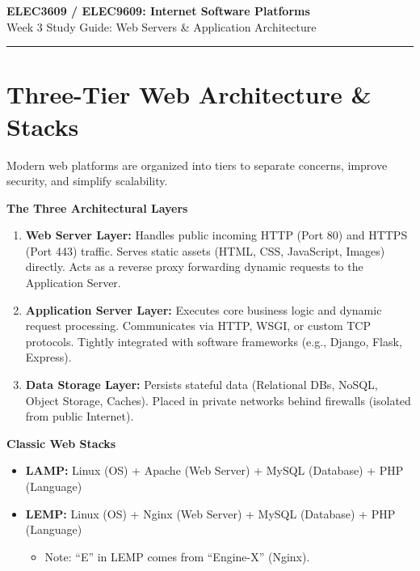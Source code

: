 ﻿\documentclass[8pt, a4paper]{article}
\begin{document}
\begin{center}
  {\LARGE\bfseries\color{accentblue} ELEC3609 / ELEC9609: Internet Software Platforms}\\[6pt]
  {\large Week 3 Study Guide: Web Servers \& Application Architecture}
\end{center}

\vspace{12pt}
\textcolor{rulegray}{\rule{\linewidth}{1pt}}
\vspace{6pt}

\section{Three-Tier Web Architecture \& Stacks}

Modern web platforms are organized into tiers to separate concerns, improve security, and simplify scalability.

\begin{conceptbox}
\textbf{The Three Architectural Layers}
\begin{enumerate}
  \item \textbf{Web Server Layer:} Handles public incoming HTTP (Port 80) and HTTPS (Port 443) traffic. Serves static assets (HTML, CSS, JavaScript, Images) directly. Acts as a reverse proxy forwarding dynamic requests to the Application Server.
  \item \textbf{Application Server Layer:} Executes core business logic and dynamic request processing. Communicates via HTTP, WSGI, or custom TCP protocols. Tightly integrated with software frameworks (e.g., Django, Flask, Express).
  \item \textbf{Data Storage Layer:} Persists stateful data (Relational DBs, NoSQL, Object Storage, Caches). Placed in private networks behind firewalls (isolated from public Internet).
\end{enumerate}
\end{conceptbox}

\begin{conceptbox}
\textbf{Classic Web Stacks}
\begin{itemize}
  \item \textbf{LAMP:} Linux (OS) + Apache (Web Server) + MySQL (Database) + PHP (Language)
  \item \textbf{LEMP:} Linux (OS) + Nginx (Web Server) + MySQL (Database) + PHP (Language)
  \begin{itemize}
    \item Note: ``E'' in LEMP comes from ``Engine-X'' (Nginx).
  \end{itemize}
\end{itemize}
\end{conceptbox}
\end{document}
